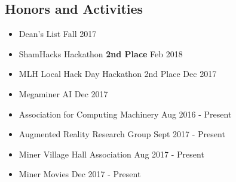 \documentclass[10pt,oneside]{article}
\begin{document}
\subsection*{Honors and Activities}
\vspace*{-4pt}
\begin{itemize}
	\item[] Dean's List
		\hfill Fall 2017
		\vspace*{-7pt}
	\item[] ShamHacks Hackathon \textemdash{} \textbf{2nd Place}
		\hfill Feb 2018
		\vspace*{-7pt}
	\item[] MLH Local Hack Day Hackathon \textemdash{} 2nd Place
		\hfill Dec 2017
		\vspace*{-7pt}
	\item[] Megaminer AI
		\hfill Dec 2017
		\vspace*{-7pt}
	\item[] Association for Computing Machinery
		\hfill Aug 2016 - Present
		\vspace*{-7pt}
	\item[] Augmented Reality Research Group
		\hfill Sept 2017 - Present
		\vspace*{-7pt}
	\item[] Miner Village Hall Association
		\hfill Aug 2017 - Present
		\vspace*{-7pt}
	\item[] Miner Movies
		\hfill Dec 2017 - Present \hspace{1cm}
\end{itemize}
\end{document}
